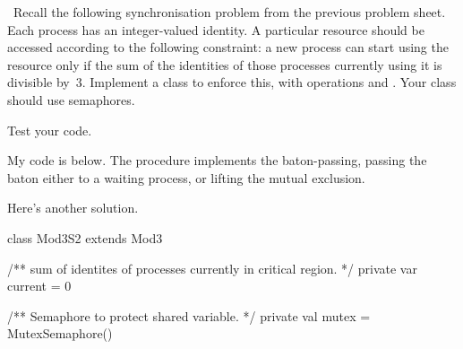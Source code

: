 \begin{question}
\Programming\ Recall the following synchronisation problem from the previous
problem sheet.  Each process has an integer-valued identity.  A particular
resource should be accessed according to the following constraint: a new
process can start using the resource only if the sum of the identities of
those processes currently using it is divisible by~3.  Implement a class to
enforce this, with operations  and .  Your class should use semaphores. 

Test your code.
\end{question}


\begin{answer}
My code is below.  The procedure  implements the baton-passing,
passing the baton either to a waiting process, or lifting the mutual
exclusion. 

Here's another solution.
\begin{scala}
class Mod3S2 extends Mod3{
  /** sum of identites of processes currently in critical region. */
  private var current = 0

  /** Semaphore to protect shared variable. */
  private val mutex = MutexSemaphore()

}
\end{scala}
\end{answer}
